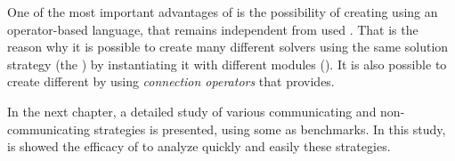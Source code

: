 One of the most important advantages of \posl{} is the possibility of creating \ass{} using an operator-based language, that remains independent from used \bothmodules{}. That is the reason why it is possible to create many different solvers using the same solution strategy (the \as) by instantiating it with different modules (\bothmodules). It is also possible to create different \comstrs{} by using {\it connection operators} that \posl{} provides.

In the next chapter, a detailed study of various communicating and non-communicating strategies is presented, using some \CSPs{} as benchmarks. In this study, is showed the efficacy of \posl{} to analyze quickly and easily these strategies.
